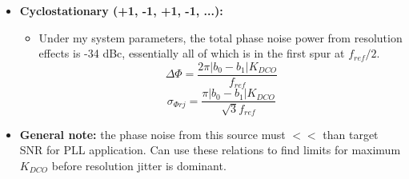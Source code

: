 			\begin{itemize}[itemsep=4pt,label=\protect---]
				\item \textbf{Cyclostationary (+1, -1, +1, -1, ...):}
				\begin{itemize}[itemsep=4pt,label=\protect$\bullet$]
					\item Under my system parameters, the total phase noise power from resolution effects is -34 dBc, essentially all of which is in the first spur at $f_{ref}/2$.
					\begin{equation}
						\Delta \Phi  = \frac{2\pi|b_0-b_1|K_{DCO}}{f_{ref}}
					\end{equation}
					\begin{equation}
						\sigma_{\Phi rj}  = \frac{\pi|b_0-b_1|K_{DCO}}{\sqrt{3}f_{ref}}
					\end{equation}
				\end{itemize}
			\item \textbf{General note:} the phase noise from this source must $<<$ than target SNR for PLL application. Can use these relations to find limits for maximum $K_{DCO}$ before resolution jitter is dominant.			
		\end{itemize}


